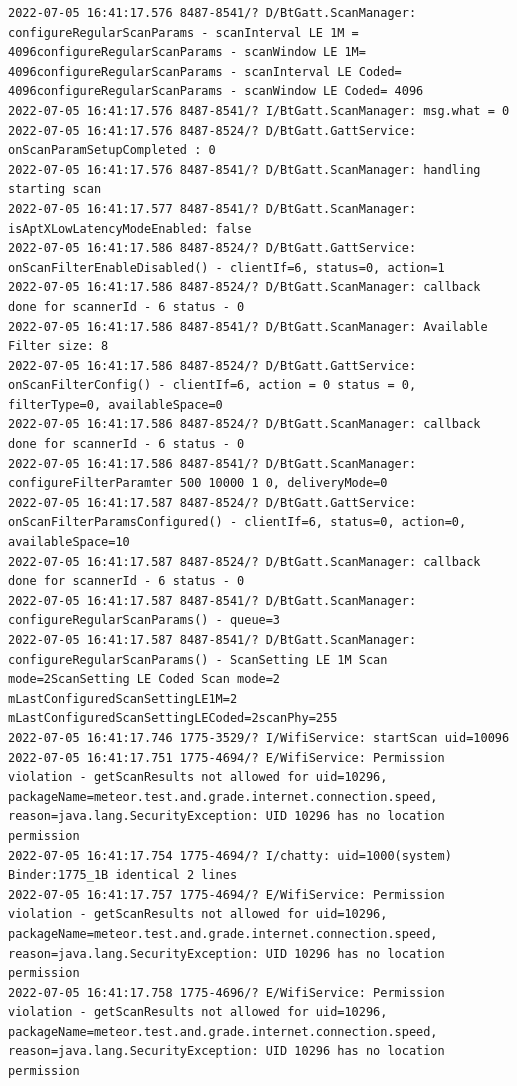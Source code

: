 \documentclass[a4paper,12pt]{book}
\begin{document}
\begin{lstlisting}
2022-07-05 16:41:17.576 8487-8541/? D/BtGatt.ScanManager: configureRegularScanParams - scanInterval LE 1M = 4096configureRegularScanParams - scanWindow LE 1M= 4096configureRegularScanParams - scanInterval LE Coded= 4096configureRegularScanParams - scanWindow LE Coded= 4096
2022-07-05 16:41:17.576 8487-8541/? I/BtGatt.ScanManager: msg.what = 0
2022-07-05 16:41:17.576 8487-8524/? D/BtGatt.GattService: onScanParamSetupCompleted : 0
2022-07-05 16:41:17.576 8487-8541/? D/BtGatt.ScanManager: handling starting scan
2022-07-05 16:41:17.577 8487-8541/? D/BtGatt.ScanManager: isAptXLowLatencyModeEnabled: false
2022-07-05 16:41:17.586 8487-8524/? D/BtGatt.GattService: onScanFilterEnableDisabled() - clientIf=6, status=0, action=1
2022-07-05 16:41:17.586 8487-8524/? D/BtGatt.ScanManager: callback done for scannerId - 6 status - 0
2022-07-05 16:41:17.586 8487-8541/? D/BtGatt.ScanManager: Available Filter size: 8
2022-07-05 16:41:17.586 8487-8524/? D/BtGatt.GattService: onScanFilterConfig() - clientIf=6, action = 0 status = 0, filterType=0, availableSpace=0
2022-07-05 16:41:17.586 8487-8524/? D/BtGatt.ScanManager: callback done for scannerId - 6 status - 0
2022-07-05 16:41:17.586 8487-8541/? D/BtGatt.ScanManager: configureFilterParamter 500 10000 1 0, deliveryMode=0
2022-07-05 16:41:17.587 8487-8524/? D/BtGatt.GattService: onScanFilterParamsConfigured() - clientIf=6, status=0, action=0, availableSpace=10
2022-07-05 16:41:17.587 8487-8524/? D/BtGatt.ScanManager: callback done for scannerId - 6 status - 0
2022-07-05 16:41:17.587 8487-8541/? D/BtGatt.ScanManager: configureRegularScanParams() - queue=3
2022-07-05 16:41:17.587 8487-8541/? D/BtGatt.ScanManager: configureRegularScanParams() - ScanSetting LE 1M Scan mode=2ScanSetting LE Coded Scan mode=2 mLastConfiguredScanSettingLE1M=2 mLastConfiguredScanSettingLECoded=2scanPhy=255
2022-07-05 16:41:17.746 1775-3529/? I/WifiService: startScan uid=10096
2022-07-05 16:41:17.751 1775-4694/? E/WifiService: Permission violation - getScanResults not allowed for uid=10296, packageName=meteor.test.and.grade.internet.connection.speed, reason=java.lang.SecurityException: UID 10296 has no location permission
2022-07-05 16:41:17.754 1775-4694/? I/chatty: uid=1000(system) Binder:1775_1B identical 2 lines
2022-07-05 16:41:17.757 1775-4694/? E/WifiService: Permission violation - getScanResults not allowed for uid=10296, packageName=meteor.test.and.grade.internet.connection.speed, reason=java.lang.SecurityException: UID 10296 has no location permission
2022-07-05 16:41:17.758 1775-4696/? E/WifiService: Permission violation - getScanResults not allowed for uid=10296, packageName=meteor.test.and.grade.internet.connection.speed, reason=java.lang.SecurityException: UID 10296 has no location permission

\end{lstlisting}
\end{document}
